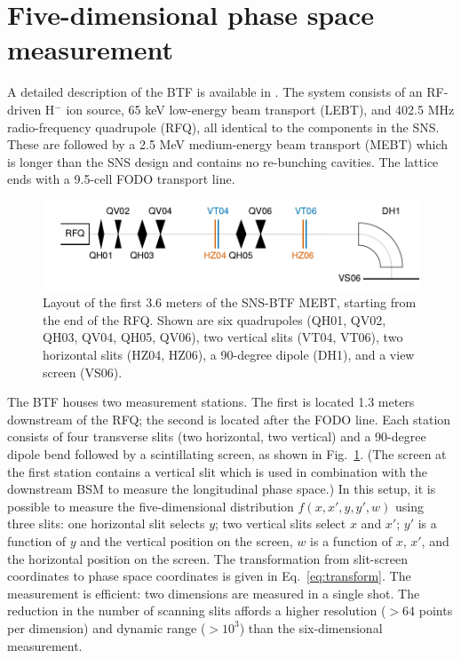 \documentclass[%
 reprint,
 amsmath,amssymb,
 aps,
prstab,
]{revtex4-2}
\begin{document}
\section{Five-dimensional phase space measurement}\label{sec:five-dimensional-phase-space-measurement}

A detailed description of the BTF is available in \cite{Zhang2020}. The system consists of an RF-driven H$^-$ ion source, 65 keV low-energy beam transport (LEBT), and 402.5 MHz radio-frequency quadrupole (RFQ), all identical to the components in the SNS. These are followed by a 2.5 MeV medium-energy beam transport (MEBT) which is longer than the SNS design and contains no re-bunching cavities. The lattice ends with a 9.5-cell FODO transport line.

\begin{figure}
    \centering
    \includegraphics[width=\columnwidth]{fig_diagram.pdf}
    \caption{Layout of the first 3.6 meters of the SNS-BTF MEBT, starting from the end of the RFQ. Shown are six quadrupoles (QH01, QV02, QH03, QV04, QH05, QV06), two vertical slits (VT04, VT06), two horizontal slits (HZ04, HZ06), a 90-degree dipole (DH1), and a view screen (VS06).}
    \label{fig:layout}
\end{figure}

The BTF houses two measurement stations. The first is located 1.3 meters downstream of the RFQ; the second is located after the FODO line. Each station consists of four transverse slits (two horizontal, two vertical) and a 90-degree dipole bend followed by a scintillating screen, as shown in Fig.~\ref{fig:layout}. (The screen at the first station contains a vertical slit which is used in combination with the downstream BSM to measure the longitudinal phase space.) In this setup, it is possible to measure the five-dimensional distribution $f(x, x', y, y', w)$ using three slits: one horizontal slit selects $y$; two vertical slits select $x$ and $x'$; $y'$ is a function of $y$ and the vertical position on the screen, $w$ is a function of $x$, $x'$, and the horizontal position on the screen. The transformation from slit-screen coordinates to phase space coordinates is given in Eq.~\eqref{eq:transform}. The measurement is efficient: two dimensions are measured in a single shot. The reduction in the number of scanning slits affords a higher resolution ($>64$ points per dimension) and dynamic range ($>10^3$) than the six-dimensional measurement.
\end{document}
